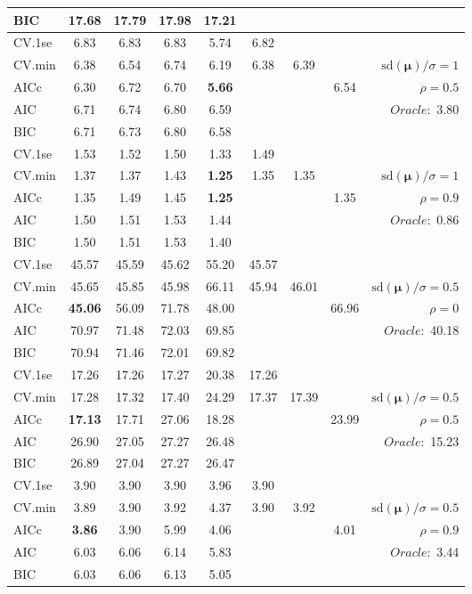 \begin{table}
\begin{center}
\begin{tabular}{l*{7}{c}|r}
BIC & 17.68 & 17.79 & 17.98 & 17.21 & & & &  \\
 \hline 
CV.1se & 6.83 & 6.83 & 6.83 & 5.74 & 6.82 & & & \\
CV.min & 6.38 & 6.54 & 6.74 & 6.19 & 6.38 & 6.39 & & $\mathrm{sd}(\mathbf{\mu})/\sigma=1$ \\
AICc & 6.30 & 6.72 & 6.70 & {\bf 5.66} & & & 6.54 &  $\rho=0.5$ \\
AIC & 6.71 & 6.74 & 6.80 & 6.59 & & & &  \multirow{2}{*}{$Oracle: $ 3.80} \\
BIC & 6.71 & 6.73 & 6.80 & 6.58 & & & &  \\
 \hline 
CV.1se & 1.53 & 1.52 & 1.50 & 1.33 & 1.49 & & & \\
CV.min & 1.37 & 1.37 & 1.43 & {\bf 1.25} & 1.35 & 1.35 & & $\mathrm{sd}(\mathbf{\mu})/\sigma=1$ \\
AICc & 1.35 & 1.49 & 1.45 & {\bf 1.25} & & & 1.35 &  $\rho=0.9$ \\
AIC & 1.50 & 1.51 & 1.53 & 1.44 & & & &  \multirow{2}{*}{$Oracle: $ 0.86} \\
BIC & 1.50 & 1.51 & 1.53 & 1.40 & & & &  \\
 \hline 
CV.1se & 45.57 & 45.59 & 45.62 & 55.20 & 45.57 & & & \\
CV.min & 45.65 & 45.85 & 45.98 & 66.11 & 45.94 & 46.01 & & $\mathrm{sd}(\mathbf{\mu})/\sigma=0.5$ \\
AICc & {\bf 45.06} & 56.09 & 71.78 & 48.00 & & & 66.96 &  $\rho=0$ \\
AIC & 70.97 & 71.48 & 72.03 & 69.85 & & & &  \multirow{2}{*}{$Oracle: $ 40.18} \\
BIC & 70.94 & 71.46 & 72.01 & 69.82 & & & &  \\
 \hline 
CV.1se & 17.26 & 17.26 & 17.27 & 20.38 & 17.26 & & & \\
CV.min & 17.28 & 17.32 & 17.40 & 24.29 & 17.37 & 17.39 & & $\mathrm{sd}(\mathbf{\mu})/\sigma=0.5$ \\
AICc & {\bf 17.13} & 17.71 & 27.06 & 18.28 & & & 23.99 &  $\rho=0.5$ \\
AIC & 26.90 & 27.05 & 27.27 & 26.48 & & & &  \multirow{2}{*}{$Oracle: $ 15.23} \\
BIC & 26.89 & 27.04 & 27.27 & 26.47 & & & &  \\
 \hline 
CV.1se & 3.90 & 3.90 & 3.90 & 3.96 & 3.90 & & & \\
CV.min & 3.89 & 3.90 & 3.92 & 4.37 & 3.90 & 3.92 & & $\mathrm{sd}(\mathbf{\mu})/\sigma=0.5$ \\
AICc & {\bf 3.86} & 3.90 & 5.99 & 4.06 & & & 4.01 &  $\rho=0.9$ \\
AIC & 6.03 & 6.06 & 6.14 & 5.83 & & & &  \multirow{2}{*}{$Oracle: $ 3.44} \\
BIC & 6.03 & 6.06 & 6.13 & 5.05 & & & &  \\
 \hline 
\end{tabular}
\end{center}
\vspace{-1cm}
\end{table}





